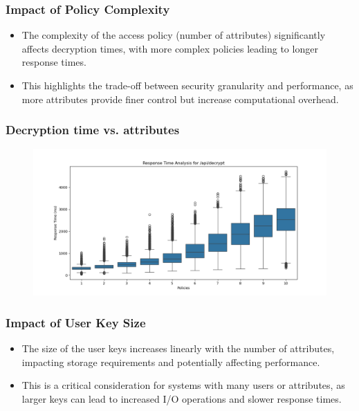 \documentclass{beamer}
\begin{document}
\begin{frame}
\frametitle{Impact of Policy Complexity}
\begin{itemize}
\item The complexity of the access policy (number of attributes) significantly affects decryption times, with more complex policies leading to longer response times.
\item This highlights the trade-off between security granularity and performance, as more attributes provide finer control but increase computational overhead.
\end{itemize}
\end{frame}

\begin{frame}
\frametitle{Decryption time vs. attributes}
\begin{figure}
\includegraphics[width=\textwidth,height=0.7\textheight,keepaspectratio]{images/phase4/response_time_api_decrypt.png}
\end{figure}
\end{frame}

\begin{frame}
\frametitle{Impact of User Key Size}
\begin{itemize}
\item The size of the user keys increases linearly with the number of attributes, impacting storage requirements and potentially affecting performance.
\item This is a critical consideration for systems with many users or attributes, as larger keys can lead to increased I/O operations and slower response times.
\end{itemize}
\end{frame}
\end{document}
